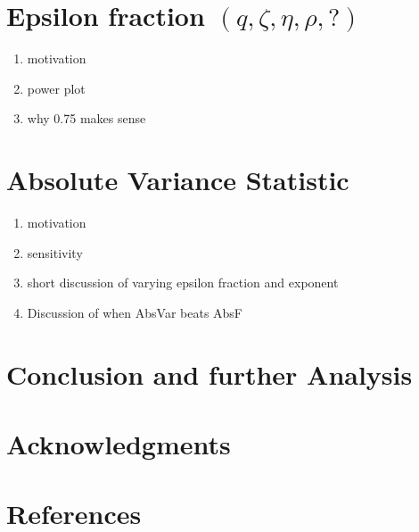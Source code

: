 \documentclass[11pt, oneside]{article}
\begin{document}
\section{Epsilon fraction $(q, \zeta, \eta, \rho, ?)$}
\begin{enumerate}
\item motivation
\item power plot
\item why 0.75 makes sense
\end{enumerate}

\section{Absolute Variance Statistic}
\begin{enumerate}
\item motivation
\item sensitivity
\item short discussion of varying epsilon fraction and exponent
\item Discussion of when AbsVar beats AbsF
\end{enumerate}

\section{Conclusion and further Analysis}

\section*{Acknowledgments}
\section*{References}
\end{document}
